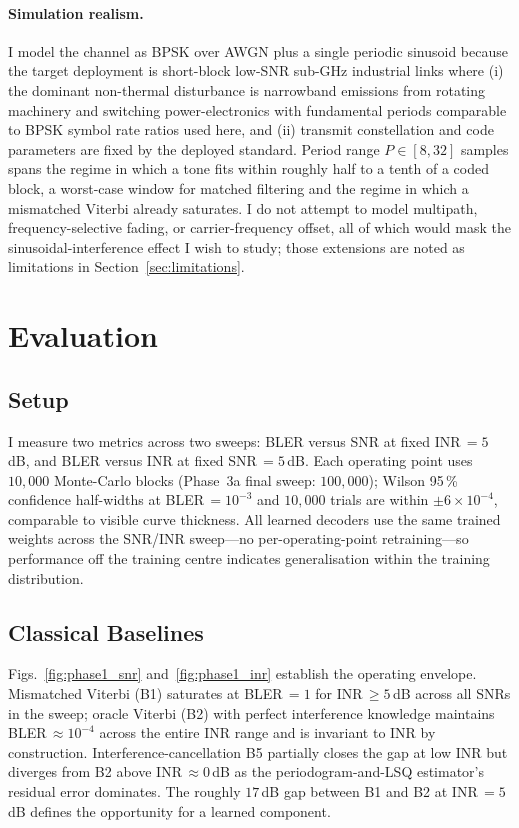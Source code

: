 \documentclass[conference]{IEEEtran}
\begin{document}
\paragraph*{Simulation realism.}
I model the channel as BPSK over AWGN plus a single periodic sinusoid
because the target deployment is short-block low-SNR sub-GHz industrial
links where (i) the dominant non-thermal disturbance is narrowband
emissions from rotating machinery and switching power-electronics with
fundamental periods comparable to BPSK symbol rate ratios used here, and
(ii) transmit constellation and code parameters are fixed by the
deployed standard.  Period range $P\in[8,32]$ samples spans the regime in
which a tone fits within roughly half to a tenth of a coded block, a
worst-case window for matched filtering and the regime in which a
mismatched Viterbi already saturates.  I do not attempt to model
multipath, frequency-selective fading, or carrier-frequency offset, all
of which would mask the sinusoidal-interference effect I wish to study;
those extensions are noted as limitations in
Section~\ref{sec:limitations}.

\section{Evaluation}
\label{sec:eval}

\subsection{Setup}
I measure two metrics across two sweeps: BLER versus SNR at fixed
INR\,$=5$\,dB, and BLER versus INR at fixed SNR\,$=5$\,dB.  Each operating
point uses $10{,}000$ Monte-Carlo blocks (Phase~3a final sweep:
$100{,}000$); Wilson 95\,\% confidence half-widths at BLER\,$=10^{-3}$
and $10{,}000$ trials are within $\pm 6{\times}10^{-4}$, comparable to
visible curve thickness.  All learned decoders use the same trained
weights across the SNR/INR sweep---no per-operating-point retraining---so
performance off the training centre indicates generalisation within the
training distribution.

\subsection{Classical Baselines}

Figs.~\ref{fig:phase1_snr} and~\ref{fig:phase1_inr} establish the
operating envelope.  Mismatched Viterbi (B1) saturates at BLER\,$=1$ for
INR\,$\geq 5$\,dB across all SNRs in the sweep; oracle Viterbi (B2) with
perfect interference knowledge maintains BLER\,$\approx 10^{-4}$ across
the entire INR range and is invariant to INR by construction.
Interference-cancellation B5 partially closes the gap at low INR but
diverges from B2 above INR\,$\approx 0$\,dB as the periodogram-and-LSQ
estimator's residual error dominates.  The roughly $17$\,dB gap between
B1 and B2 at INR\,$=5$\,dB defines the opportunity for a learned
component.
\end{document}
